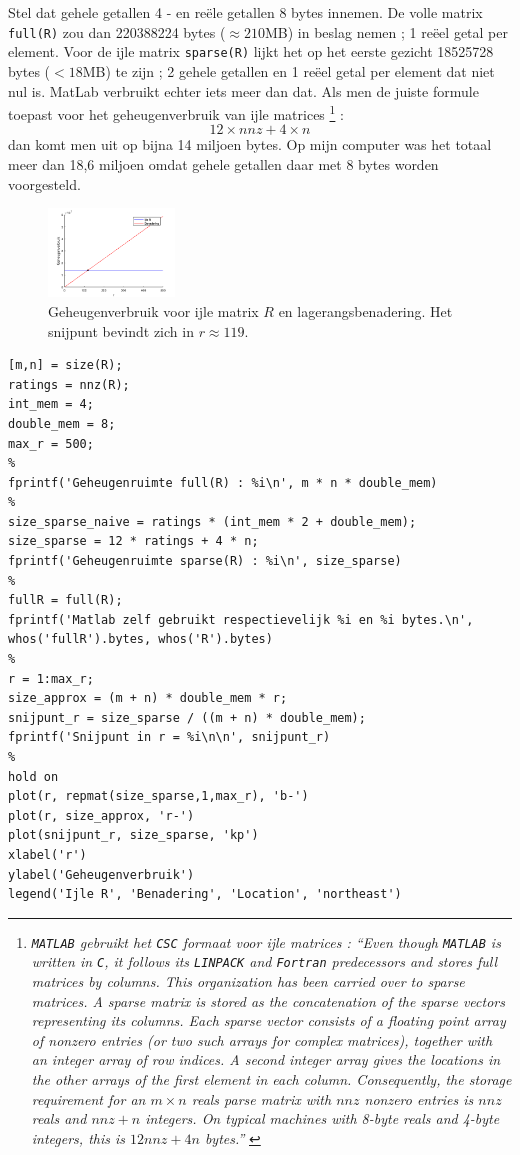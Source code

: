 Stel dat gehele getallen 4 - en re\"ele getallen 8 bytes innemen. De volle matrix \texttt{full(R)} zou dan 220388224 bytes ($\approx 210$MB) in beslag nemen ; 1 re\"eel getal per element. Voor de ijle matrix \texttt{sparse(R)} lijkt het op het eerste gezicht 18525728 bytes ($< 18$MB) te zijn ; 2 gehele getallen en 1 re\"eel getal per element dat niet nul is. MatLab verbruikt echter iets meer dan dat. Als men de juiste formule toepast voor het geheugenverbruik van ijle matrices \footnote{\textit{\texttt{MATLAB} gebruikt het \texttt{CSC} formaat voor ijle matrices : ``Even though \texttt{MATLAB} is written in \texttt{C}, it follows its \texttt{LINPACK} and \texttt{Fortran} predecessors and stores full matrices by columns. This organization has been carried over to sparse matrices. A sparse matrix is stored as the concatenation of the sparse vectors representing its columns. Each sparse vector consists of a floating point array of nonzero entries (or two such arrays for complex matrices), together with an integer array of row indices. A second integer array gives the locations in the other arrays of the first element in each column. Consequently, the storage requirement for an $m\times n$ reals parse matrix with $nnz$ nonzero entries is $nnz$ reals and $nnz+n$ integers. On typical machines with 8-byte reals and 4-byte integers, this is $12nnz+4n$ bytes.''} \cite{Gilbert1992}} :
$$12\times nnz+4\times n$$
dan komt men uit op bijna 14 miljoen bytes. Op mijn computer was het totaal meer dan 18,6 miljoen omdat gehele getallen daar met 8 bytes worden voorgesteld.

\begin{figure}[h]
\centering
\includegraphics[width=0.3\textwidth]{res/op2.png}
\caption{Geheugenverbruik voor ijle matrix $R$ en lagerangsbenadering. Het snijpunt bevindt zich in $r\approx 119$.}
\label{fig:op2}
\end{figure}

\begin{lstlisting}
[m,n] = size(R);
ratings = nnz(R);
int_mem = 4;
double_mem = 8;
max_r = 500;
%
fprintf('Geheugenruimte full(R) : %i\n', m * n * double_mem)
%
size_sparse_naive = ratings * (int_mem * 2 + double_mem);
size_sparse = 12 * ratings + 4 * n;
fprintf('Geheugenruimte sparse(R) : %i\n', size_sparse)
%
fullR = full(R);
fprintf('Matlab zelf gebruikt respectievelijk %i en %i bytes.\n', whos('fullR').bytes, whos('R').bytes)
%
r = 1:max_r;
size_approx = (m + n) * double_mem * r;
snijpunt_r = size_sparse / ((m + n) * double_mem);
fprintf('Snijpunt in r = %i\n\n', snijpunt_r)
%
hold on
plot(r, repmat(size_sparse,1,max_r), 'b-')
plot(r, size_approx, 'r-')
plot(snijpunt_r, size_sparse, 'kp')
xlabel('r')
ylabel('Geheugenverbruik')
legend('Ijle R', 'Benadering', 'Location', 'northeast') 
\end{lstlisting}

